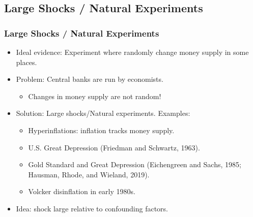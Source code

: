 \documentclass[english,xcolor=svgnames]{beamer}
\begin{document}
\subsection{Large Shocks / Natural Experiments}

\begin{frame}
\frametitle{Large Shocks / Natural Experiments}
\begin{itemize}
	\item Ideal evidence: Experiment where randomly change money supply in some places.
	\item Problem: Central banks are run by economists.
	\begin{itemize}
		\item Changes in money supply are not random!
	\end{itemize}
	\item Solution: Large shocks/Natural experiments. Examples:
	\begin{itemize}
		\item Hyperinflations: inflation tracks money supply.
		\item U.S. Great Depression (Friedman and Schwartz, 1963).
		\item Gold Standard and Great Depression (Eichengreen and Sachs,
1985; Hausman, Rhode, and Wieland, 2019).
		\item Volcker disinflation in early 1980s.
	\end{itemize}
	\item Idea: shock large relative to confounding factors.
\end{itemize}
\end{frame}
\end{document}

